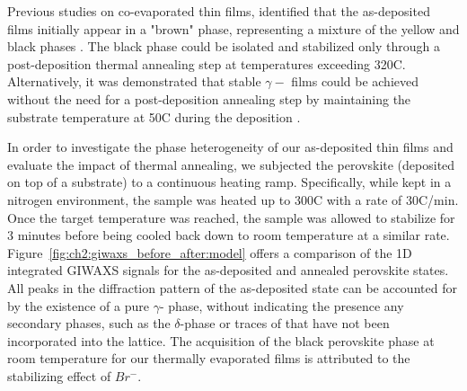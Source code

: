 Previous studies on co-evaporated  thin films, identified that the as-deposited films initially appear in a "brown" phase, representing a mixture of the yellow and black phases \cite{Frolova2017HighlyPbI2, PintorMonroy2021All-EvaporatedApplications}. The black phase could be isolated and stabilized only through a post-deposition thermal annealing step at temperatures exceeding 320\degree C. Alternatively, it was demonstrated that stable $\gamma-$ films could be achieved without the need for a post-deposition annealing step by maintaining the substrate temperature at 50\degree C during the deposition \cite{Dong2021High-TemperatureCells}. 

In order to investigate the phase heterogeneity of our as-deposited  thin films and evaluate the impact of thermal annealing, we subjected the perovskite (deposited on top of a  substrate) to a continuous heating ramp. Specifically, while kept in a nitrogen environment, the sample was heated up to 300\degree C with a rate of 30\degree C/min. Once the target temperature was reached, the sample was allowed to stabilize for 3 minutes before being cooled back down to room temperature at a similar rate. Figure~\ref{fig:ch2:giwaxs_before_after:model} offers a comparison of the 1D integrated GIWAXS signals for the as-deposited and annealed perovskite states. All peaks in the diffraction pattern of the as-deposited state can be accounted for by the existence of a pure $\gamma$- phase, without indicating the presence any secondary phases, such as the $\delta$-phase or traces of  that have not been incorporated into the lattice. The acquisition of the black perovskite phase at room temperature for our thermally evaporated films is attributed to the stabilizing effect of $Br^-$. 


